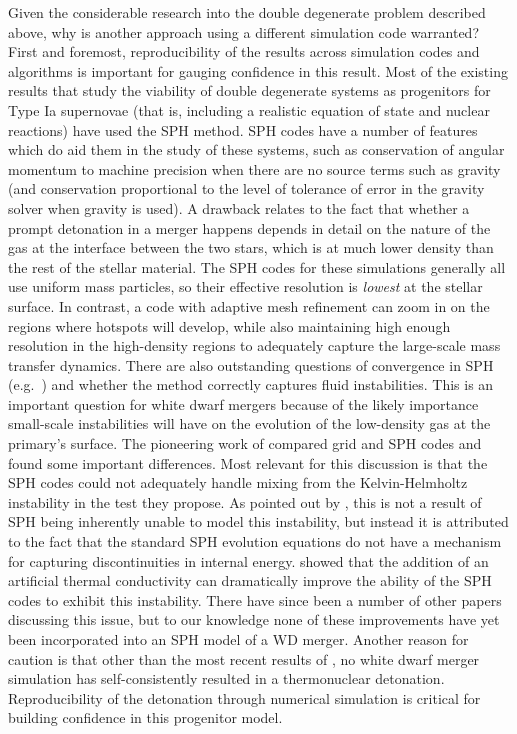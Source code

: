\documentclass[12pt]{article}
\begin{document}
Given the considerable research into the double degenerate problem 
described above, why is another approach using a different simulation
code warranted? First and foremost, reproducibility of the results
across simulation codes and algorithms is important for gauging
confidence in this result. Most of the existing results that study 
the viability of double degenerate systems as progenitors for
Type Ia supernovae (that is, including a realistic 
equation of state and nuclear reactions) have
used the SPH method. SPH codes have a number of features which do aid
them in the study of these systems, such as conservation of
angular momentum to machine precision when there are no source terms
such as gravity (and conservation proportional to the level of
tolerance of error in the gravity solver when gravity is used).
A drawback relates to the fact that whether a prompt detonation
in a merger happens depends in detail on the nature of the
gas at the interface between the two stars, which is at much lower
density than the rest of the stellar material. The SPH codes for these
simulations generally all use
uniform mass particles, so their effective resolution is
\textit{lowest} at the stellar surface. In contrast, a code
with adaptive mesh refinement can zoom in on the regions where
hotspots will develop, while also maintaining high enough resolution
in the high-density regions to adequately capture the large-scale mass
transfer dynamics. There are also outstanding questions of
convergence in SPH (e.g.\ \citealt{zhu-SPH:2014}) and whether the method
correctly captures fluid instabilities. This is an important question
for white dwarf mergers because of the likely importance small-scale
instabilities will have on the evolution of the low-density gas at the
primary's surface. The pioneering work of \cite{agertz:2007} compared
grid and SPH codes and found some important differences. Most relevant
for this discussion is that the SPH codes could not adequately handle
mixing from the Kelvin-Helmholtz instability in the test they
propose. As pointed out by \cite{price:2008}, this is not a result of
SPH being inherently unable to model this instability, but instead it
is attributed to the fact that the standard SPH evolution equations do
not have a mechanism for capturing discontinuities in internal
energy. \citeauthor{price:2008} showed that the addition of an
artificial thermal conductivity can dramatically improve the ability
of the SPH codes to exhibit this instability. There have since been a
number of other papers discussing this issue, but to our knowledge
none of these improvements have yet been incorporated into an SPH
model of a WD merger. Another reason for caution is that other than the
most recent results of \cite{kashyap:2015}, no white dwarf merger simulation has self-consistently
resulted in a thermonuclear detonation. Reproducibility of the detonation 
through numerical simulation is critical for building 
confidence in this progenitor model.
\end{document}
